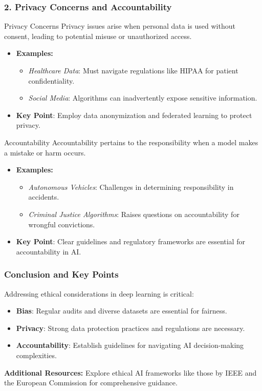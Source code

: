 \documentclass{beamer}
\begin{document}
\begin{frame}[fragile]
    \frametitle{2. Privacy Concerns and Accountability}
    \begin{block}{Privacy Concerns}
        Privacy issues arise when personal data is used without consent, leading to potential misuse or unauthorized access.
    \end{block}
    
    \begin{itemize}
        \item \textbf{Examples:}
            \begin{itemize}
                \item \textit{Healthcare Data}: Must navigate regulations like HIPAA for patient confidentiality.
                \item \textit{Social Media}: Algorithms can inadvertently expose sensitive information.
            \end{itemize}
        \item \textbf{Key Point}: Employ data anonymization and federated learning to protect privacy.
    \end{itemize}

    \begin{block}{Accountability}
        Accountability pertains to the responsibility when a model makes a mistake or harm occurs.
    \end{block}

    \begin{itemize}
        \item \textbf{Examples:}
            \begin{itemize}
                \item \textit{Autonomous Vehicles}: Challenges in determining responsibility in accidents.
                \item \textit{Criminal Justice Algorithms}: Raises questions on accountability for wrongful convictions.
            \end{itemize}
        \item \textbf{Key Point}: Clear guidelines and regulatory frameworks are essential for accountability in AI.
    \end{itemize}
\end{frame}

\begin{frame}[fragile]
    \frametitle{Conclusion and Key Points}
    Addressing ethical considerations in deep learning is critical:
    \begin{itemize}
        \item \textbf{Bias}: Regular audits and diverse datasets are essential for fairness.
        \item \textbf{Privacy}: Strong data protection practices and regulations are necessary.
        \item \textbf{Accountability}: Establish guidelines for navigating AI decision-making complexities.
    \end{itemize}

    \textbf{Additional Resources:} Explore ethical AI frameworks like those by IEEE and the European Commission for comprehensive guidance.
\end{frame}
\end{document}
